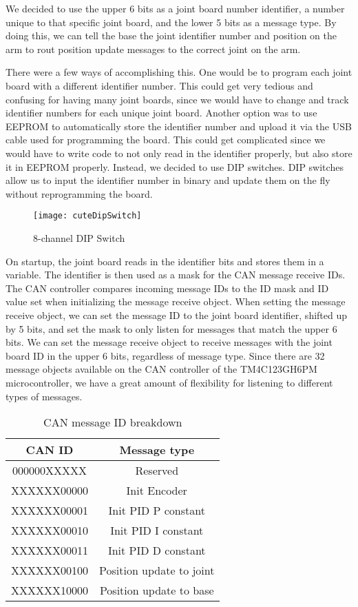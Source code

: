 \noindent We decided to use the upper 6 bits as a joint board number identifier, a number unique to that specific joint board, and the lower 5 bits as a message type. By doing this, we can tell the base the joint identifier number and position on the arm to rout position update messages to the correct joint on the arm.

\noindent There were a few ways of accomplishing this. One would be to program each joint board with a different identifier number. This could get very tedious and confusing for having many joint boards, since we would have to change and track identifier numbers for each unique joint board. Another option was to use EEPROM to automatically store the identifier number and upload it via the USB cable used for programming the board. This could get complicated since we would have to write code to not only read in the identifier properly, but also store it in EEPROM properly. Instead, we decided to use DIP switches. DIP switches allow us to input the identifier number in binary and update them on the fly without reprogramming the board.

\begin{figure}[H]
\centering
\texttt{[image: cuteDipSwitch]}
\caption{8-channel DIP Switch}
\label{fig:8_channel DIP Switch}
\end{figure}

\noindent On startup, the joint board reads in the identifier bits and stores them in a variable. The identifier is then used as a mask for the CAN message receive IDs. The CAN controller compares incoming message IDs to the ID mask and ID value set when initializing the message receive object. When setting the message receive object, we can set the message ID to the joint board identifier, shifted up by 5 bits, and set the mask to only listen for messages that match the upper 6 bits. We can set the message receive object to receive messages with the joint board ID in the upper 6 bits, regardless of message type. Since there are 32 message objects available on the CAN controller of the TM4C123GH6PM microcontroller, we have a great amount of flexibility for listening to different types of messages.

\begin{table}
	\centering
	\caption{CAN message ID breakdown}
	\begin{tabular}{| c | c |}
		\hline
		CAN ID & Message type \\
		\hline
		\textsc{000000XXXXX} & Reserved \\
		\textsc{XXXXXX00000} & Init Encoder \\
		\textsc{XXXXXX00001} & Init PID P constant \\
		\textsc{XXXXXX00010} & Init PID I constant \\
		\textsc{XXXXXX00011} & Init PID D constant \\
		\textsc{XXXXXX00100} & Position update to joint \\
		\textsc{XXXXXX10000} & Position update to base\\
		\hline
	\end{tabular}
\end{table}

